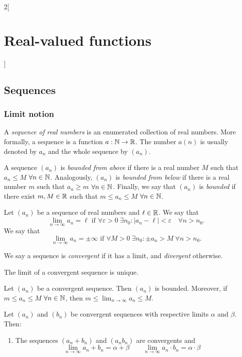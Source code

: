 \documentclass[../../../main.tex]{subfiles}
\begin{document}
\begin{multicols}{2}[\section{Real-valued functions}]
  \subsection{Sequences}
  \subsubsection{Limit notion}
  \begin{definition}
    A \textit{sequence of real numbers} is an enumerated collection of real numbers. More formally, a sequence is a function $a:\mathbb{N}\rightarrow\mathbb{R}$. The number $a(n)$ is usually denoted by $a_n$ and the whole sequence by $(a_n)$.
  \end{definition}
  \begin{definition}
    A sequence $(a_n)$ is \textit{bounded from above} if there is a real number $M$ such that $a_n\leq M$ $\forall n\in\mathbb{N}$.
    Analogously, $(a_n)$ is \textit{bounded from below} if there is a real number $m$ such that $a_n\geq m$ $\forall n\in\mathbb{N}$.
    Finally, we say that $(a_n)$ is \textit{bounded} if there exist $m,M\in\mathbb{R}$ such that $m\leq a_n\leq M$ $\forall n\in\mathbb{N}$.
  \end{definition}
  \begin{definition}[Limit]
    Let $(a_n)$ be a sequence of real numbers and $\ell\in\mathbb{R}$. We say that $$\lim_{n\to\infty} a_n=\ell\text{ if }\forall\varepsilon>0\;\exists n_0:|a_n-\ell|<\varepsilon\quad\forall n>n_0.$$
    We say that $$\lim_{n\to\infty} a_n=\pm\infty\text{ if }\forall M>0\;\exists n_0:\pm a_n>M\;\forall n>n_0.$$
  \end{definition}
  \begin{definition}
    We say a sequence is \textit{convergent} if it has a limit, and \textit{divergent} otherwise.
  \end{definition}
  \begin{lemma}
    The limit of a convergent sequence is unique.
  \end{lemma}
  \begin{lemma}
    Let $(a_n)$ be a convergent sequence. Then $(a_n)$ is bounded. Moreover, if $m\leq a_n\leq M$ $\forall n\in\mathbb{N}$, then $\displaystyle m\leq \lim_{n\to\infty} a_n\leq M$.
  \end{lemma}
  \begin{lemma}
    Let $(a_n)$ and $(b_n)$ be convergent sequences with respective limits $\alpha$ and $\beta$. Then:
    \begin{enumerate}
      \item The sequences $(a_n+b_n)$ and $(a_nb_n)$ are convergents and $$\lim_{n\to\infty} a_n+b_n=\alpha+\beta\qquad\lim_{n\to\infty} a_n\cdot b_n=\alpha\cdot \beta$$

\end{enumerate}
\end{lemma}
\end{multicols}
\end{document}
